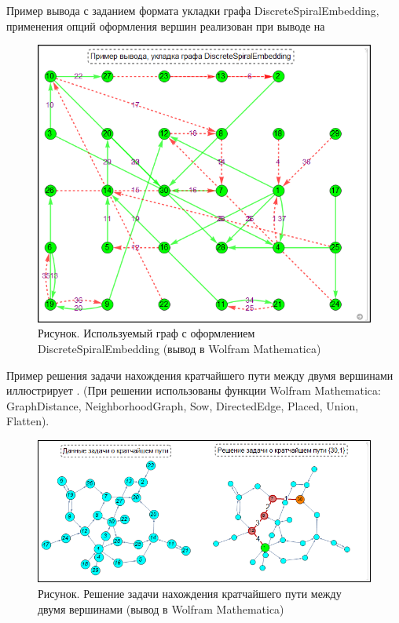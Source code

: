 Пример вывода с заданием формата укладки графа DiscreteSpiralEmbedding, применения опций оформления вершин реализован при выводе на \textit{} 

\begin{figure}[H]
	\includegraphics[scale=0.87]{images/part7/chapter_integration/integr_alg34.png}
	\caption{Рисунок. Используемый граф с оформлением DiscreteSpiralEmbedding (вывод в Wolfram Mathematica)}
	\label{fig:integr_alg34}
\end{figure}

Пример решения задачи нахождения кратчайшего пути между двумя вершинами иллюстрирует \textit{}. (При решении использованы функции Wolfram Mathematica: GraphDistance, NeighborhoodGraph, Sow, DirectedEdge, Placed, Union, Flatten).

\begin{figure}[H]
	\includegraphics[scale=0.55]{images/part7/chapter_integration/integr_alg35.png}
	\caption{Рисунок. Решение задачи нахождения кратчайшего пути между двумя вершинами (вывод в Wolfram Mathematica)}
	\label{fig:integr_alg35}
\end{figure}

